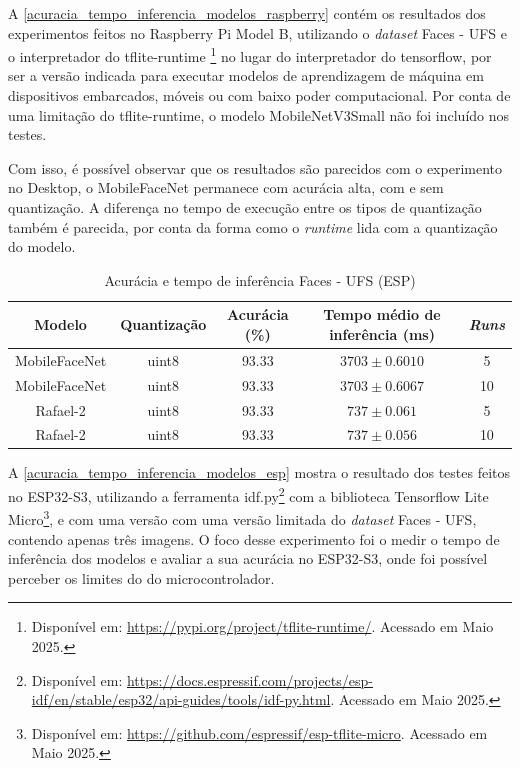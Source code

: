 A \autoref{acuracia_tempo_inferencia_modelos_raspberry} contém os resultados dos experimentos feitos no
Raspberry Pi Model B, utilizando o \textit{dataset} Faces - UFS e o interpretador do tflite-runtime
\footnote{Disponível em: \url{https://pypi.org/project/tflite-runtime/}. Acessado em Maio 2025.}
no lugar do interpretador do tensorflow, por ser a versão indicada para executar modelos de aprendizagem de
máquina em dispositivos embarcados, móveis ou com baixo poder computacional. Por conta de uma limitação
do tflite-runtime, o modelo MobileNetV3Small não foi incluído nos testes.

Com isso, é possível observar que os resultados são parecidos com o experimento no Desktop, o MobileFaceNet
permanece com acurácia alta, com e sem quantização. A diferença no tempo de execução entre os tipos de
quantização também é parecida, por conta da forma como o \textit{runtime} lida com a quantização do modelo.

\begin{table}[htb]
\centering
\ABNTEXfontereduzida
\caption[Acurácia e tempo de inferência (ESP)]{Acurácia e tempo de inferência Faces - UFS (ESP)}
\label{acuracia_tempo_inferencia_modelos_esp}
\begin{tabular}{ |c|c|c|c|c| }
	\hline
	\textbf{Modelo} & \textbf{Quantização} & \textbf{Acurácia (\%)} & \textbf{Tempo médio de inferência (ms)} & \textbf{\textit{Runs}} \\
	\hline
	MobileFaceNet 	&uint8	& 	93.33& $3703 \pm 0.6010$ & 5 \\
	MobileFaceNet 	&uint8	& 	93.33& $3703 \pm 0.6067$ & 10 \\
	Rafael-2	&uint8	& 	93.33& $737 \pm 0.061$ & 5\\
	Rafael-2	&uint8	& 	93.33& $737 \pm 0.056$ & 10\\
	\hline
\end{tabular}
\end{table}

A \autoref{acuracia_tempo_inferencia_modelos_esp} mostra o resultado dos testes feitos no ESP32-S3,
utilizando a ferramenta idf.py\footnote{Disponível em:
\url{https://docs.espressif.com/projects/esp-idf/en/stable/esp32/api-guides/tools/idf-py.html}.
Acessado em Maio 2025.}
com a biblioteca Tensorflow Lite Micro\footnote{Disponível em: \url{
https://github.com/espressif/esp-tflite-micro}. Acessado em Maio 2025.},
e com uma versão com uma versão limitada do \textit{dataset} Faces - UFS, contendo apenas três imagens.
O foco desse experimento foi o medir o tempo de inferência dos modelos e avaliar a sua acurácia
no ESP32-S3, onde foi possível perceber os limites do do microcontrolador.

